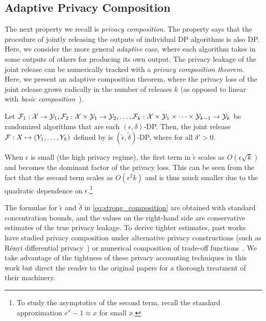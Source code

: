 \subsection{Adaptive Privacy Composition}
The next property we recall is \emph{privacy composition}.
The property says that the procedure of jointly releasing the outputs of individual DP algorithms is also DP.
Here, we consider the more general \emph{adaptive} case, where each algorithm takes in some outputs of others for producing its own output.
The privacy leakage of the joint release can be numerically tracked with a \emph{privacy composition theorem}.
Here, we present an adaptive composition theorem, where the privacy loss of the joint release grows radically in the number of releases $k$ (as opposed to linear with \emph{basic composition}~\cite{dwork2014algorithmic}).
\begin{theo}
Let $\mathcal{F}_1: \mathcal{X} \to \mathcal{Y}_1, \mathcal{F}_2: \mathcal{X} \times \mathcal{Y}_1 \to \mathcal{Y}_2, \dots, \mathcal{F}_k: \mathcal{X} \times \mathcal{Y}_1 \times \cdots \times \mathcal{Y}_{k-1} \to \mathcal{Y}_k$ be randomized algorithms that are each $(\epsilon, \delta)$-DP.
Then, the joint release $\mathcal{F}: X \mapsto \left( Y_1, \dots, Y_k \right)$ defined by  
is $(\widetilde{\epsilon}, \widetilde{\delta})$-DP, where
for all $\delta' > 0$.
\end{theo}
When $\epsilon$ is small (the high privacy regime), the first term in $\widetilde{\epsilon}$ scales as $O(\epsilon \sqrt{k})$ and becomes the dominant factor of the privacy loss. 
This can be seen from the fact that the second term scales as $O(\epsilon^2 k)$ and is thus much smaller due to the quadratic dependence on $\epsilon$.\footnote{To study the asymptotics of the second term, recall the standard approximation $e^x - 1 \approx x$ for small $x$.}

The formulae for $\widetilde{\epsilon}$ and $\widetilde{\delta}$ in \eqref{eq:strong_composition} are obtained with standard concentration bounds, and the values on the right-hand side are conservative estimates of the true privacy leakage.
To derive tighter estimates, past works have studied privacy composition under alternative privacy constructions (such as R\'enyi differential privacy~\cite{mironov2017renyi}) or numerical composition of trade-off functions~\cite{dong2019gaussian,gopi2021numerical,zhu2022optimal}.
We take advantage of the tightness of these privacy accounting techniques in this work but direct the reader to the original papers for a thorough treatment of their machinery.

